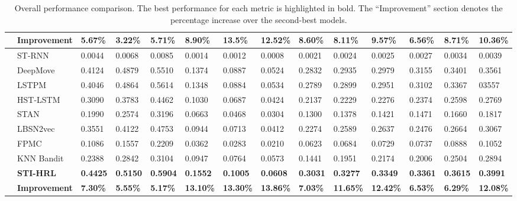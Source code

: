 \documentclass[letterpaper]{article} %
\begin{document}
\begin{table}[htbp]
\begin{tabular}{c|C{1.8cm}|p{0.8cm}p{0.8cm}p{0.8cm}|p{0.8cm}p{0.8cm}p{0.8cm}|p{0.8cm}p{0.8cm}p{0.8cm}|p{0.8cm}p{0.8cm}p{0.8cm}}
\midrule
&  \textbf{Improvement} & 
\textbf{5.67\%}& \textbf{3.22\%}& \textbf{5.71\%}& 
\textbf{8.90\%}& \textbf{13.5\%}& \textbf{12.52\%}& 
\textbf{8.60\%}& \textbf{8.11\%}& \textbf{9.57\%}& 
\textbf{6.56\%}& \textbf{8.71\%}& \textbf{10.36\%}\\

\midrule
{}

&ST-RNN & 0.0044 & 0.0068 & 0.0085 & 0.0014 & 0.0012 & 0.0008 & 0.0021 & 0.0024& 0.0025 & 0.0027 & 0.0034 & 0.0039\\
& DeepMove& 0.4124 & 0.4879 & 0.5510 & 0.1374 & 0.0887 & 0.0524 & 0.2832 & 0.2935& 0.2979 & 0.3155 & 0.3401& 0.3561 \\
&  LSTPM & 0.4046 & 0.4864 & 0.5614 & 0.1348 & 0.0884 & 0.0534 & 0.2789 & 0.2899& 0.2951 & 0.3102 & 0.3367 & 03557\\
& HST-LSTM & 0.3090 & 0.3783 & 0.4462 & 0.1030 & 0.0687 & 0.0424 & 0.2137 & 0.2229& 0.2276 & 0.2374 & 0.2598& 0.2769\\
&  STAN& 0.1990 & 0.2574 & 0.3196 & 0.0663 & 0.0468 & 0.0304 & 0.1300 & 0.1378& 0.1421 & 0.1471 & 0.1660& 0.1817 \\
& LBSN2vec & 0.3551 & 0.4122 & 0.4753  & 0.0944  &  0.0713 &  0.0412 & 0.2274  & 0.2589 & 0.2637 &  0.2476 & 0.2664 & 0.3067\\
& FPMC & 0.1086 & 0.1557 & 0.2209 & 0.0362 & 0.0283 & 0.0210 & 0.0623 & 0.0684& 0.0729& 0.0737 & 0.0888 & 0.1052\\
& KNN Bandit & 0.2388 & 0.2842 & 0.3104  & 0.0947  &  0.0764 &  0.0573 & 0.1441  & 0.1951 &  0.2174 & 0.2006  & 0.2504 & 0.2894  \\
& \textbf{STI-HRL}  
& \textbf{0.4425} &\textbf{0.5150}  & \textbf{0.5904}  & \textbf{0.1552}   & \textbf{0.1005}  &  \textbf{0.0608} & \textbf{0.3031}  & \textbf{0.3277} & \textbf{0.3349}  &  \textbf{0.3361 }& \textbf{0.3615} & \textbf{0.3991} \\

\midrule
&  \textbf{Improvement} & 
\textbf{7.30\%}& \textbf{5.55\%}& \textbf{5.17\%}& 
\textbf{13.10\%}& \textbf{13.30\%}& \textbf{13.86\%}& 
\textbf{7.03\%}& \textbf{11.65\%}& \textbf{12.42\%}& \textbf{6.53\%}& \textbf{6.29\%}& \textbf{12.08\%}\\

\bottomrule
\end{tabular}
\caption{Overall performance comparison. The best performance for each metric is highlighted in bold. The ``Improvement'' section denotes the percentage increase over the second-best models.}
\label{Experment_Table}
\end{table}
\end{document}
